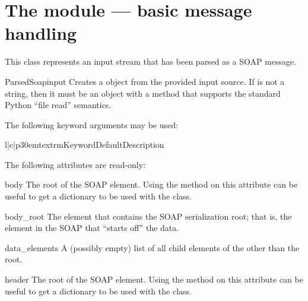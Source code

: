 \chapter{The  module --- basic message handling}

This class represents an input stream that has been parsed as a SOAP
message.

\begin{classdesc}{ParsedSoap}{input}
Creates a  object from the provided input source.
If  is not a string, then it must be an object with a
 method that supports the standard Python ``file read''
semantics.

The following keyword arguments may be used:

\begin{tableiii}{l|c|p{30em}}{textrm}{Keyword}{Default}{Description}
\end{tableiii}

\end{classdesc}

The following attributes are read-only:

\begin{memberdesc}{body}
The root of the SOAP  element.
Using the  method on this attribute can be useful
to get a dictionary to be used with the  class.
\end{memberdesc}

\begin{memberdesc}{body_root}
The element that contains the SOAP serialization root; that is,
the element in the SOAP  that ``starts off'' the data.
\end{memberdesc}

\begin{memberdesc}{data_elements}
A (possibly empty) list of all child elements of the  other
than the root.
\end{memberdesc}

\begin{memberdesc}{header}
The root of the SOAP  element.
Using the  method on this attribute can be useful
to get a dictionary to be used with the  class.
\end{memberdesc}

